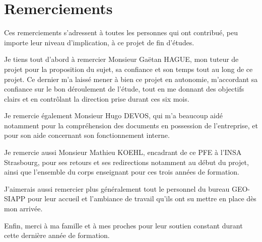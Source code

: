 \section*{Remerciements}

Ces remerciements s'adressent à toutes les personnes qui ont contribué, peu importe leur niveau d'implication, à ce projet de fin d'études.

Je tiens tout d'abord à remercier Monsieur Gaëtan HAGUE, mon tuteur de projet pour la proposition du sujet, sa confiance et son temps tout au long de ce projet. Ce dernier m'a laissé mener à bien ce projet en autonomie, m'accordant sa confiance sur le bon déroulement de l'étude, tout en me donnant des objectifs clairs et en contrôlant la direction prise durant ces six mois.

Je remercie également Monsieur Hugo DEVOS, qui m'a beaucoup aidé notamment pour la compréhension des documents en possession de l'entreprise, et pour son aide concernant son fonctionnement interne.

Je remercie aussi Monsieur Mathieu KOEHL, encadrant de ce PFE à l'INSA Strasbourg, pour ses retours et ses redirections notamment au début du projet, ainsi que l'ensemble du corps enseignant pour ces trois années de formation.

J'aimerais aussi remercier plus généralement tout le personnel du bureau GEO-SIAPP pour leur accueil et l'ambiance de travail qu'ils ont su mettre en place dès mon arrivée.

Enfin, merci à ma famille et à mes proches pour leur soutien constant durant cette dernière année de formation.

